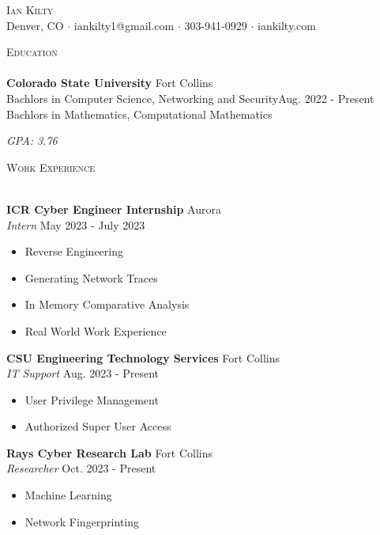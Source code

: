 \documentclass[a4paper]{article}
\newcommand{\lineunder} {
    \vspace*{-8pt} \\
    \hspace*{-18pt} \hrulefill \\
}
\newcommand{\header} [1] {
    {\hspace*{-18pt}\vspace*{6pt} \textsc{#1}}
    \vspace*{-6pt} \lineunder
}
\begin{document}
\vspace*{-40pt}

    

\vspace*{-10pt}
\begin{center}
	{\Huge \scshape {Ian Kilty}}\\
	Denver, CO $\cdot$ iankilty1@gmail.com $\cdot$ 303-941-0929 $\cdot$ iankilty.com\\
\end{center}

\header{Education}
\textbf{Colorado State University}
\hfill Fort Collins\\

Bachlors in Computer Science, Networking and Security\hfill Aug. 2022 - Present\\

Bachlors in Mathematics, Computational Mathematics

\textit{GPA: 3.76}
\vspace{2mm}

\header{Work Experience}
\vspace{1mm}

\textbf{ICR Cyber Engineer Internship} \hfill Aurora\\
\textit{Intern} \hfill May 2023 - July 2023\\
\vspace{-1mm}
\begin{itemize} \itemsep 1pt
    \item Reverse Engineering
	\item Generating Network Traces
	\item In Memory Comparative Analysis
	\item Real World Work Experience 
\end{itemize}

\textbf{CSU Engineering Technology Services} \hfill Fort Collins\\
\textit{IT Support} \hfill Aug. 2023 - Present\\
\vspace{-1mm}
\begin{itemize} \itemsep 1pt
	\item User Privilege Management
	\item Authorized Super User Access
\end{itemize}

\textbf{Rays Cyber Research Lab} \hfill Fort Collins\\
\textit{Researcher} \hfill Oct. 2023 - Present\\
\vspace{-1mm}
\begin{itemize} \itemsep 1pt
	\item Machine Learning
	\item Network Fingerprinting
\end{itemize}
\end{document}
